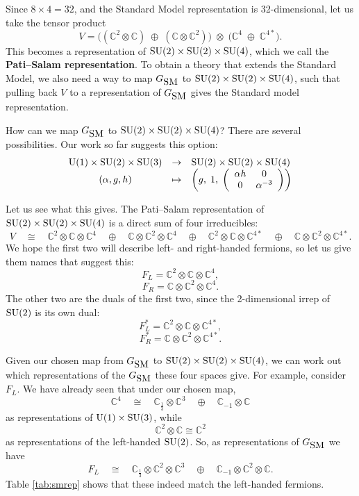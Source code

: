 \documentclass[12pt]{article}
\newcommand{\C}{{\mathbb C}}  %
\newcommand{\U}{{\rm U}}    %
\newcommand{\SU}{{\rm SU}}    %
\newcommand{\iso}{\cong} %
\newcommand{\third}{\frac{1}{3}} %
\newcommand{\GSM}{{G_{\mbox{\rm SM}}}}  %
\begin{document}
Since $8 \times 4 = 32$, and the Standard Model representation is 
32-dimensional, let us take the tensor product
\[     V =   \big((\C^2 \otimes \C) \; \oplus \; (\C \otimes \C^2)\big)
\; \otimes \; \big(\C^4 \; \oplus \; \C^{4*}\big). \]
This becomes a representation of $\SU(2) \times \SU(2) \times \SU(4)$,
which we call the {\bf Pati--Salam representation}.
To obtain a theory that extends the Standard Model, 
we also need a way to map $\GSM$ to $\SU(2) \times \SU(2) \times 
\SU(4)$, such that pulling back $V$ to a representation of $\GSM$ 
gives the Standard model representation.

How can we map $\GSM$ to $\SU(2) \times \SU(2) \times \SU(4)$?  There
are several possibilities.  Our work so far suggests this option:
\[ \begin{array}{ccl}
\U(1) \times \SU(2) \times \SU(3) &\to& \SU(2) \times \SU(2) \times \SU(4) \\
  (\alpha, g, h)  &\mapsto&  
\left( g, \; 1, \;
\left(
\begin{array}{c c}
	\alpha h & 0 \\
	0 & \alpha^{-3}
\end{array}
\right) 
\right)
\end{array}
\]

Let us see what this gives.  The Pati--Salam representation
of $\SU(2) \times \SU(2) \times \SU(4)$ is a direct sum
of four irreducibles:
\[   V \quad \iso \quad 
\C^2 \otimes \C \otimes \C^4 \quad \oplus \quad
\C \otimes \C^2 \otimes \C^4 \quad \oplus \quad
\C^2 \otimes \C \otimes \C^{4*} \quad \oplus \quad
\C \otimes \C^2 \otimes \C^{4*}.
\]
We hope the first two will describe left- and right-handed
fermions, so let us give them names that suggest this:
\[         F_L = \C^2 \otimes \C \otimes \C^4,  \]
\[         F_R = \C \otimes \C^2 \otimes \C^4 . \]
The other two are the duals of the first two, since the 2-dimensional
irrep of $\SU(2)$ is its own dual:
\[         F_L^* = \C^2 \otimes \C \otimes \C^{4*},   \]
\[         F_R^* = \C \otimes \C^2 \otimes \C^{4*} . \]

Given our chosen map from $\GSM$ to $\SU(2) \times \SU(2) \times \SU(4)$,
we can work out which representations of the $\GSM$ these four spaces give.
For example, consider $F_L$.   We have already seen that under our
chosen map, 
\[ \C^4 \quad \iso \quad
\C_{\third} \otimes \C^3 \quad \oplus \quad \C_{-1} \otimes \C \]
as representations of $\U(1) \times \SU(3)$, while
\[  \C^2 \otimes \C \iso \C^2 \] 
as representations of the left-handed $\SU(2)$. 
So, as representations of $\GSM$ we have
\[         F_L \quad \iso 
\quad \C_{\third} \otimes \C^2 \otimes \C^3  \quad \oplus 
\quad \C_{-1} \otimes \C^2 \otimes \C .\]
Table \ref{tab:smrep} shows that these indeed match the left-handed
fermions.
\end{document}
